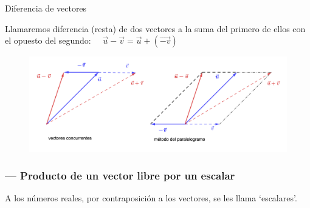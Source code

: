 \begin{defi}{Diferencia de vectores}
\begin{multicols}{2}
	Llamaremos diferencia (resta) de dos vectores a la suma del primero de ellos con el opuesto del segundo: 
	$\quad \vec u - \vec v = \vec u + (\vec {-v})$
	
\begin{figure}[H]
	\centering
	\includegraphics[width=.6\textwidth]{imagenes/imagenes09/T09IM03.png}
	\end{figure}
	
\end{multicols}
\end{defi}

\subsubsection{--- Producto de un vector libre por un escalar}

A los números reales, por contraposición a los vectores, se les llama `escalares'.

